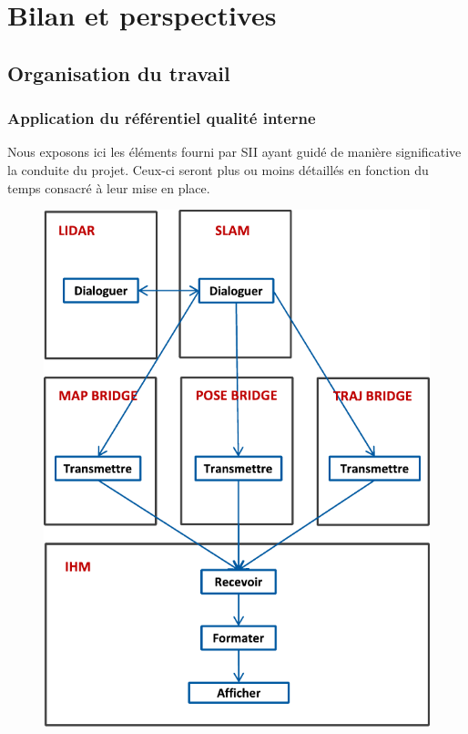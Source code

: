 \chapter{Bilan et perspectives}
\label{chap:bilan}

\section{Organisation du travail}
\label{sec:orga}
  \subsection{Application du référentiel qualité interne}
  \label{sec:qualite-interne}

  Nous exposons ici les éléments fourni par SII ayant guidé de manière significative la conduite du projet. 
  Ceux-ci seront plus ou moins détaillés en fonction du temps consacré à leur mise en place.
  
    \begin{figure}[h]
    \centering
      \includegraphics[width=.6\linewidth]{figures/rel-fonctions}  
    \label{fig:rel-fonctions}
  \end{figure}
  
